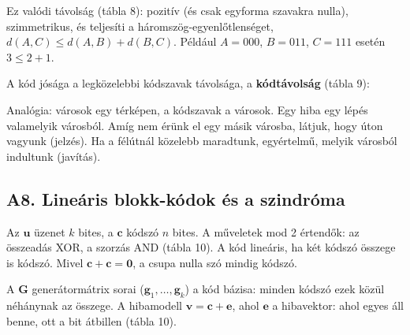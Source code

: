 \begin{center}\end{center}

Ez valódi távolság (tábla 8): pozitív (és csak egyforma szavakra nulla), szimmetrikus, és teljesíti a háromszög-egyenlőtlenséget, $d(A,C) \le d(A,B)+d(B,C)$. Például $A=000$, $B=011$, $C=111$ esetén $3 \le 2+1$.

A kód jósága a legközelebbi kódszavak távolsága, a \textbf{kódtávolság} (tábla 9):

\begin{center}\end{center}

\begin{center}\end{center}

Analógia: városok egy térképen, a kódszavak a városok. Egy hiba egy lépés valamelyik városból. Amíg nem érünk el egy másik városba, látjuk, hogy úton vagyunk (jelzés). Ha a félútnál közelebb maradtunk, egyértelmű, melyik városból indultunk (javítás).

\subsection{\texorpdfstring{A8. Lineáris blokk-kódok és a szindróma}{A8. Lineáris blokk-kódok és a szindróma}}\label{a6-linearis}
Az $\mathbf u$ üzenet $k$ bites, a $\mathbf c$ kódszó $n$ bites. A műveletek mod 2 értendők: az összeadás XOR, a szorzás AND (tábla 10). A kód lineáris, ha két kódszó összege is kódszó. Mivel $\mathbf c+\mathbf c=\mathbf 0$, a csupa nulla szó mindig kódszó.

\begin{center}\end{center}

A $\mathbf G$ generátormátrix sorai ($\mathbf g_1, \dots, \mathbf g_k$) a kód bázisa: minden kódszó ezek közül néhánynak az összege. A hibamodell $\mathbf v=\mathbf c+\mathbf e$, ahol $\mathbf e$ a hibavektor: ahol egyes áll benne, ott a bit átbillen (tábla 10).

